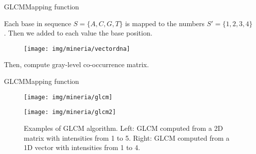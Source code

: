 \documentclass[10pt]{beamer}
\newcommand{\1}{
	\setbeamertemplate{background}{
		\texttt{[image: img/1\_dna]}
		\tikz[overlay] \fill[fill opacity=0.75,fill=white] (0,0) rectangle (-\paperwidth,\paperheight);
	}
}
\begin{document}
\begin{frame}{GLCM}{Mapping function}
	\begin{block}{}
		Each base in sequence $S = \{A, C, G, T\}$ is mapped to the numbers $S' = \{ 1, 2, 3, 4 \}$. Then we added to each value the base position. 
	\end{block}

	\begin{figure}[]
		\centering
		\texttt{[image: img/mineria/vectordna]}		
	\end{figure}

	\begin{block}{}
		Then, compute  gray-level co-occurrence matrix.
	\end{block}
\end{frame}

\begin{frame}{GLCM}{Mapping function}
	 \begin{figure}[h]
		\centering
		\begin{multicols}{2}
			\texttt{[image: img/mineria/glcm]}\par 
			\texttt{[image: img/mineria/glcm2]}\par 
		\end{multicols}
		\caption{Examples of GLCM algorithm. Left: GLCM computed from a 2D matrix with intensities from 1 to 5.  Right: GLCM computed from a 1D vector with intensities from 1 to 4.}
		\label{img:glcm}
	\end{figure}
\end{frame}
\end{document}
